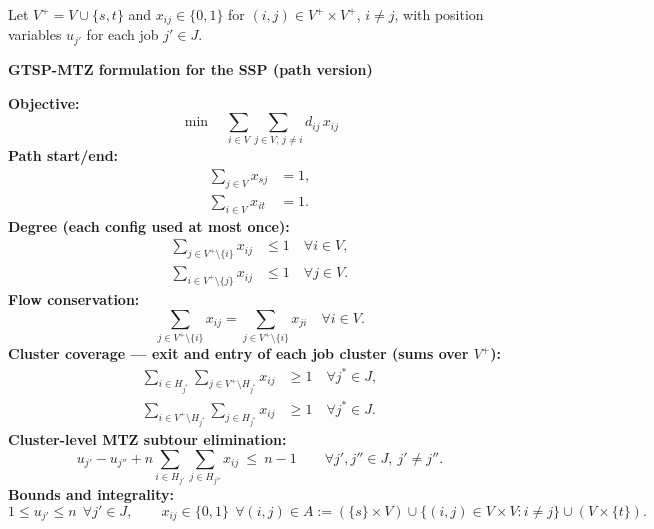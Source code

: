 \documentclass[11pt,a4paper]{article}
\theoremstyle{plain}
\theoremstyle{definition}
\begin{document}
Let $V^{+}=V\cup\{s,t\}$ and $x_{ij}\in\{0,1\}$ for $(i,j)\in V^{+}\times V^{+}$,
$i\ne j$, with position variables $u_{j'}$ for each job $j'\in J$.

\begin{formbox}
	\textbf{GTSP-MTZ formulation for the SSP (path version)}

	\smallskip
	\textbf{Objective:}
	\begin{equation}\label{eq:obj}
		\min \quad \sum_{i\in V}\sum_{j\in V,\,j\neq i} d_{ij}\,x_{ij}
	\end{equation}
	\textbf{Path start/end:}
	\begin{align}
		\sum_{j\in V} x_{sj}&=1, \label{eq:source}\\
		\sum_{i\in V} x_{it}&=1. \label{eq:sink}
	\end{align}
	\textbf{Degree (each config used at most once):}
	\begin{align}
		\sum_{j\in V^{+}\setminus\{i\}} x_{ij}&\le 1 \quad \forall i\in V,\label{eq:outdeg}\\
		\sum_{i\in V^{+}\setminus\{j\}} x_{ij}&\le 1 \quad \forall j\in V.\label{eq:indeg}
	\end{align}
	\textbf{Flow conservation:}
	\begin{equation}\label{eq:flow}
		\sum_{j\in V^{+}\setminus\{i\}} x_{ij}=\sum_{j\in V^{+}\setminus\{i\}} x_{ji}
		\quad\forall i\in V.
	\end{equation}
	\textbf{Cluster coverage --- exit and entry of each job cluster (sums over $V^{+}$):}
	\begin{align}
		\sum_{i\in H_{j^{*}}}\sum_{j\in V^{+}\setminus H_{j^{*}}} x_{ij}&\ge 1
		\quad\forall j^{*}\in J,\label{eq:exit}\\
		\sum_{i\in V^{+}\setminus H_{j^{*}}}\sum_{j\in H_{j^{*}}} x_{ij}&\ge 1
		\quad\forall j^{*}\in J.\label{eq:entry}
	\end{align}
	\textbf{Cluster-level MTZ subtour elimination:}
	\begin{equation}\label{eq:MTZ}
		u_{j'}-u_{j''}+n\!\!\sum_{i\in H_{j'}}\sum_{j\in H_{j''}}\! x_{ij}\ \le\ n-1
		\qquad\forall j',j''\in J,\ j'\neq j''.
	\end{equation}
	\textbf{Bounds and integrality:}
	\begin{equation}\label{eq:ubounds}
		1\le u_{j'}\le n\ \ \forall j'\in J,\qquad x_{ij}\in\{0,1\}\ \ \forall (i,j)\in
		A:=(\{s\}\times V)\cup\{(i,j)\in V\times V:i\ne j\}\cup(V\times\{t\}).
	\end{equation}
\end{formbox}
\end{document}
